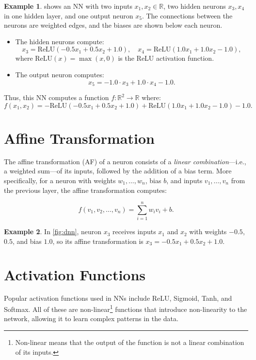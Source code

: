 \documentclass[oneside,11pt,dvipsnames]{book}
\numberwithin{equation}{section}
\theoremstyle{definition}
\newtheorem{example}{Example}[section]
\theoremstyle{remark}
\newcommand{\relu}[1]{\mathrm{ReLU}\left(#1\right)}
\begin{document}
\begin{example}\label{ex:dnn}
 shows an NN with two inputs $x_1, x_2 \in \mathbb{R}$, two hidden neurons \(x_3, x_4\) in one hidden layer, and one output neuron \(x_5\). The connections between the neurons are weighted edges, and the biases are shown below each neuron.


\begin{itemize}
    \item The hidden neurons compute:
    \[
    x_3 = \relu{-0.5 x_1 + 0.5 x_2 + 1.0},\quad x_4 = \relu{1.0 x_1 + 1.0 x_2 - 1.0},
    \]
    where $\relu{x} = \max(x, 0)$ is the ReLU activation function.
    \item The output neuron computes:
    \[
    x_5 = -1.0 \cdot x_3 + 1.0 \cdot x_4 - 1.0.
    \]
\end{itemize}

Thus, this NN computes a function \(f: \mathbb{R}^2 \to \mathbb{R}\) where:
\[
f(x_1, x_2) = -\relu{-0.5 x_1 + 0.5 x_2 + 1.0} + \relu{1.0 x_1 + 1.0 x_2 - 1.0} - 1.0.
\]
\end{example}


\section{Affine Transformation}\label{sec:affine}

The affine transformation (AF) of a neuron consists of a \emph{linear combination}---i.e., a weighted sum---of its inputs, followed by the addition of a bias term. More specifically, for a neuron with weights \(w_1, \dots, w_n\), bias \(b\), and inputs \(v_1, \dots, v_n\) from the previous layer, the affine transformation computes:

\begin{equation}\label{eq:affine}   
    f(v_1, v_2, \dots,v_n) = \sum_{i=1}^{n} w_i v_i + b.
\end{equation}


\begin{example}
In \autoref{fig:dnn}, neuron \(x_3\) receives inputs \(x_1\) and \(x_2\) with weights \(-0.5\), \(0.5\), and bias \(1.0\), so its affine transformation is $x_3 = -0.5 x_1 + 0.5 x_2 + 1.0$.
\end{example}


\section{Activation Functions}\label{sec:activation}
Popular activation functions used in NNs include ReLU, Sigmoid, Tanh, and Softmax. All of these are non-linear\footnote{Non-linear means that the output of the function is not a linear combination of its inputs.} functions that introduce non-linearity to the network, allowing it to learn complex patterns in the data.
\end{document}
